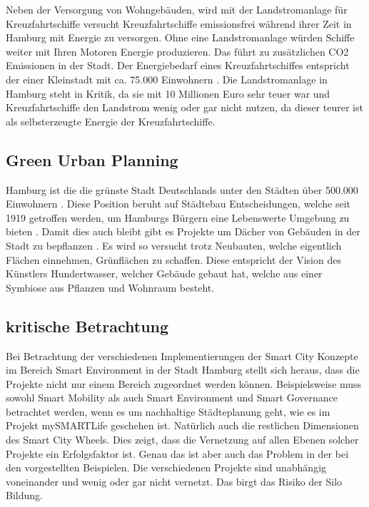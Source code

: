 Neben der Versorgung von Wohngebäuden, wird mit der Landstromanlage für Kreuzfahrtschiffe versucht Kreuzfahrtschiffe emissionsfrei während ihrer Zeit in Hamburg mit Energie zu versorgen.
Ohne eine Landstromanlage würden Schiffe weiter mit Ihren Motoren Energie produzieren.
Das führt zu zusätzlichen CO2 Emissionen in der Stadt.
Der Energiebedarf eines Kreuzfahrtschiffes entspricht der einer Kleinstadt mit ca. 75.000 Einwohnern \autocite[vgl.][]{SmartCityKompass.OD}.
Die Landstromanlage in Hamburg steht in Kritik, da sie mit 10 Millionen Euro sehr teuer war und Kreuzfahrtschiffe den Landstrom wenig oder gar nicht nutzen, da dieser teurer ist als selbsterzeugte Energie der Kreuzfahrtschiffe.

\subsection{Green Urban Planning}
Hamburg ist die die grünste Stadt Deutschlands unter den Städten über 500.000 Einwohnern \autocite[vgl.][]{BerlinerMorgenpost.2016}.
Diese Position beruht auf Städtebau Entscheidungen, welche seit 1919 getroffen werden, um Hamburgs Bürgern eine Lebenswerte Umgebung zu bieten \autocite[vgl.][]{Hamburg.ODC}.
Damit dies auch bleibt gibt es Projekte um Dächer von Gebäuden in der Stadt zu bepflanzen \autocite[vgl.][]{Hamburg.ODD}.
Es wird so versucht trotz Neubauten, welche eigentlich Flächen einnehmen, Grünflächen zu schaffen.
Diese entspricht der Vision des Künstlers Hundertwasser, welcher Gebäude gebaut hat, welche aus einer Symbiose aus Pflanzen und Wohnraum besteht.

\subsection{kritische Betrachtung}
Bei Betrachtung der verschiedenen Implementierungen der Smart City Konzepte im Bereich Smart Environment in der Stadt Hamburg stellt sich heraus, dass die Projekte nicht nur einem Bereich zugeordnet werden können.
Beispielsweise muss sowohl Smart Mobility als auch Smart Environment und Smart Governance betrachtet werden, wenn es um nachhaltige Städteplanung geht, wie es im Projekt mySMARTLife geschehen ist.
Natürlich auch die restlichen Dimensionen des Smart City Wheels.
Dies zeigt, dass die Vernetzung auf allen Ebenen solcher Projekte ein Erfolgsfaktor ist.
Genau das ist aber auch das Problem in der bei den vorgestellten Beispielen.
Die verschiedenen Projekte sind unabhängig voneinander und wenig oder gar nicht vernetzt.
Das birgt das Risiko der Silo Bildung.